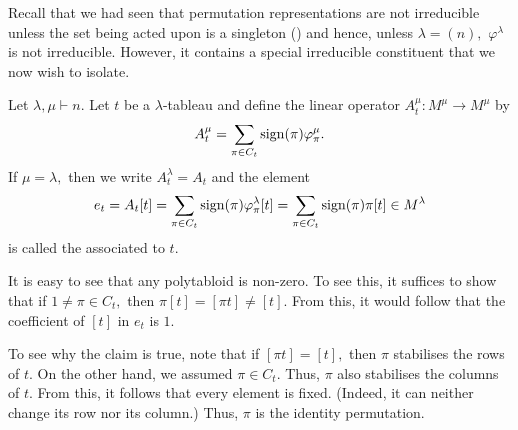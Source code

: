 Recall that we had seen that permutation representations are not irreducible unless the set being acted upon is a singleton () and hence, unless $\lambda = (n),$ $\varphi^\lambda$ is not irreducible. However, it contains a special irreducible constituent that we now wish to isolate.

\begin{defn}%
	Let $\lambda, \mu \vdash n.$ Let $t$ be a $\lambda$-tableau and define the linear operator $A^\mu_t : M^\mu \to M^\mu$ by
	\begin{equation*} 
		A^\mu_t = \sum_{\pi \in C_t} \operatorname{sign}(\pi)\varphi^\mu_\pi.
	\end{equation*}
	If $\mu = \lambda,$ then we write $A^\lambda_t = A_t$ and the element
	\begin{equation*} 
		e_t = A_t[t] = \sum_{\pi \in C_t} \operatorname{sign}(\pi)\varphi^\lambda_\pi[t] = \sum_{\pi \in C_t} \operatorname{sign}(\pi)\pi[t] \in M^\lambda
	\end{equation*}
	is called the  associated to $t.$
\end{defn}	
\begin{rem}
	It is easy to see that any polytabloid is non-zero. To see this, it suffices to show that if $1 \neq \pi \in C_t,$ then $\pi[t] = [\pi t] \neq [t].$ From this, it would follow that the coefficient of $[t]$ in $e_t$ is $1.$

	To see why the claim is true, note that if $[\pi t] = [t],$ then $\pi$ stabilises the rows of $t.$ On the other hand, we assumed $\pi \in C_t.$ Thus, $\pi$ also stabilises the columns of $t.$ From this, it follows that every element is fixed. (Indeed, it can neither change its row nor its column.) Thus, $\pi$ is the identity permutation.
\end{rem}

